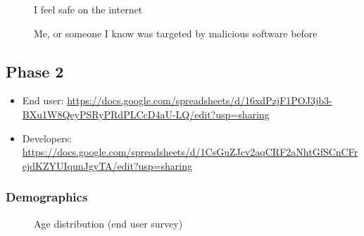 \begin{figure}[H]
\centering
{}
\vspace*{-1mm}
\caption{I feel safe on the internet}
\end{figure}

\begin{figure}[H]
\centering
{}
\vspace*{-1mm}
\caption{Me, or someone I know was targeted by malicious software before}
\end{figure}


\subsection{Phase 2}

\begin{itemize}
    \item End user: \url{https://docs.google.com/spreadsheets/d/16xdPzjF1POJ3jb3-BXu1W8QeyPSRyPRdPLCcD4aU-LQ/edit?usp=sharing}
    \item Developers: \url{https://docs.google.com/spreadsheets/d/1CsGuZJcv2aqCRF2aNhtGfSCnCFrejdKZYUIqunJgyTA/edit?usp=sharing}
\end{itemize}

\subsubsection{Demographics}

\begin{figure}[H]
\centering
{}
\vspace*{-1mm}
\caption{Age distribution (end user survey)}
\end{figure}

